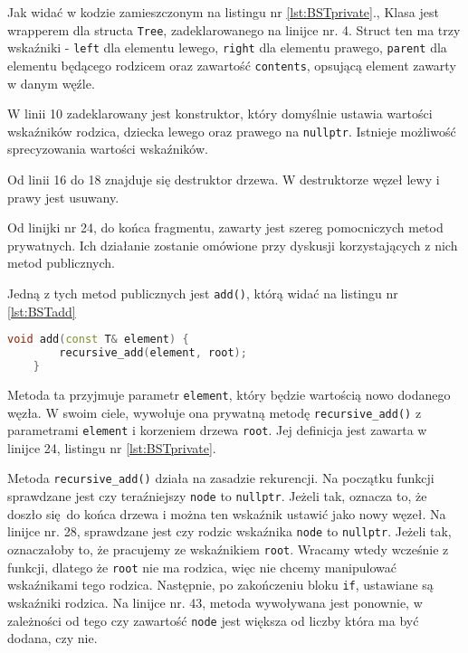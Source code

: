 Jak widać w kodzie zamieszczonym na listingu nr \ref{lst:BSTprivate}., Klasa jest wrapperem dla structa \texttt{Tree}, zadeklarowanego na linijce nr. 4. Struct ten ma trzy wskaźniki - \texttt{left} dla elementu lewego, \texttt{right} dla elementu prawego, \texttt{parent} dla elementu będącego rodzicem oraz zawartość \texttt{contents}, opsującą element zawarty w danym węźle. 

W linii 10 zadeklarowany jest konstruktor, który domyślnie ustawia wartości wskaźników rodzica, dziecka lewego oraz prawego na \texttt{nullptr}. Istnieje możliwość sprecyzowania wartości wskaźników.

Od linii 16 do 18 znajduje się destruktor drzewa. W destruktorze węzeł lewy i prawy jest usuwany.

Od linijki nr 24, do końca fragmentu, zawarty jest szereg pomocniczych metod prywatnych. Ich działanie zostanie omówione przy dyskusji korzystających z nich metod publicznych.

Jedną z tych metod publicznych jest \texttt{add()}, którą widać na listingu nr \ref{lst:BSTadd}

\begin{lstlisting}[caption=Metoda \texttt{add()}, label={lst:BSTadd}, language=C++]
	void add(const T& element) {
		recursive_add(element, root);
	}

\end{lstlisting}

Metoda ta przyjmuje parametr \texttt{element}, który będzie wartością nowo dodanego węzła. W swoim ciele, wywołuje ona prywatną metodę \texttt{recursive\_add()} z parametrami \texttt{element} i korzeniem drzewa \texttt{root}. Jej definicja jest zawarta w linijce 24, listingu nr \ref{lst:BSTprivate}. 

Metoda \texttt{recursive\_add()} działa na zasadzie rekurencji. Na początku funkcji sprawdzane jest czy teraźniejszy \texttt{node} to \texttt{nullptr}. Jeżeli tak, oznacza to, że doszło się do końca drzewa i można ten wskaźnik ustawić jako nowy węzeł. Na linijce nr. 28, sprawdzane jest czy rodzic wskaźnika \texttt{node} to \texttt{nullptr}. Jeżeli tak, oznaczałoby to, że pracujemy ze wskaźnikiem \texttt{root}. Wracamy wtedy wcześnie z funkcji, dlatego że \texttt{root} nie ma rodzica, więc nie chcemy manipulować wskaźnikami tego rodzica. Następnie, po zakończeniu bloku \texttt{if}, ustawiane są wskaźniki rodzica. Na linijce nr. 43, metoda wywoływana jest ponownie, w zależności od tego czy zawartość \texttt{node} jest większa od liczby która ma być dodana, czy nie.

